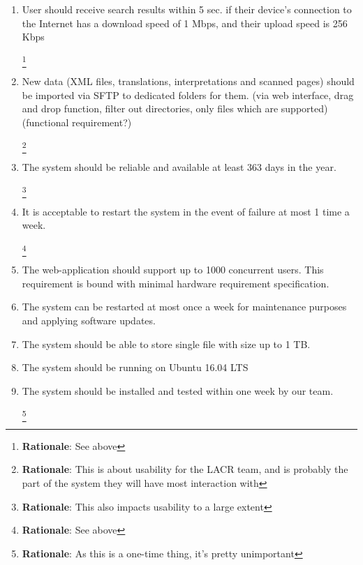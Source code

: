 \documentclass[10pt,a4paper]{report}
\newcommand{\rationale}[1]{
    \footnote{
        \textbf{Rationale}: #1
    }
}
\begin{document}
\begin{enumerate}
            \item User should receive search results within 5 sec. if their device's connection to the Internet has a download speed of 1 Mbps, and their upload speed is 256 Kbps
            \rationale{See above}
            
            \item New data (XML files, translations, interpretations and scanned pages) should be imported via SFTP to dedicated folders for them. (via web interface, drag and drop function, filter out directories, only files which are supported) (functional requirement?)
            \rationale{This is about usability for the LACR team, and is probably the part of the system they will have most interaction with}
            
            \item The system should be reliable and available at least 363 days in the year.
            \rationale{This also impacts usability to a large extent}
            
            \item It is acceptable to restart the system in the event of failure at most 1 time a week.
            \rationale{See above}
            
            \item The web-application should support up to 1000 concurrent users. This requirement is bound with minimal hardware requirement specification.
            
            \item The system can be restarted at most once a week for maintenance purposes and applying software updates.
            
            \item The system should be able to store single file with size up to 1 TB.
            
            \item The system should be running on Ubuntu 16.04 LTS
            
            \item The system should be installed and tested within one week by our team.
            \rationale{As this is a one-time thing, it's pretty unimportant}
        \end{enumerate}
\end{document}
